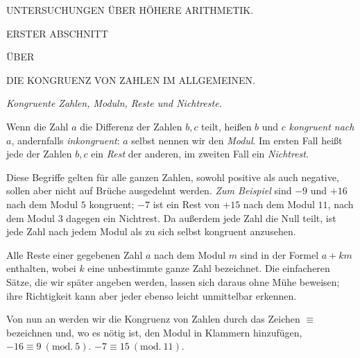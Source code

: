 \begin{center}
{\Large\textsc{UNTERSUCHUNGEN ÜBER HÖHERE ARITHMETIK.}}

\BookRule{\linewidth}

\textsc{ERSTER ABSCHNITT}

{\scriptsize\textsc{ÜBER}}

\textsc{DIE KONGRUENZ VON ZAHLEN IM ALLGEMEINEN.}

\end{center}

\begin{center}
\emph{Kongruente Zahlen, Moduln, Reste und Nichtreste.}
\end{center}


Wenn die Zahl $a$ die Differenz der Zahlen $b, c$ teilt, heißen $b$ und $c$ \emph{kongruent nach $a$}, andernfalls \emph{inkongruent}: $a$ selbst nennen wir den \emph{Modul}. Im ersten Fall heißt jede der Zahlen $b, c$ ein \emph{Rest} der anderen, im zweiten Fall ein \emph{Nichtrest}.

Diese Begriffe gelten für alle ganzen Zahlen, sowohl positive als auch negative, sollen aber nicht auf Brüche ausgedehnt werden. \emph{Zum Beispiel} sind $-9$ und $+16$ nach dem Modul $5$ kongruent; $-7$ ist ein Rest von $+15$ nach dem Modul $11$, nach dem Modul $3$ dagegen ein Nichtrest. Da außerdem jede Zahl die Null teilt, ist jede Zahl nach jedem Modul als zu sich selbst kongruent anzusehen.


Alle Reste einer gegebenen Zahl $a$ nach dem Modul $m$ sind in der Formel $a+km$ enthalten, wobei $k$ eine unbestimmte ganze Zahl bezeichnet. Die einfacheren Sätze, die wir später angeben werden, lassen sich daraus ohne Mühe beweisen; ihre Richtigkeit kann aber jeder ebenso leicht unmittelbar erkennen.

Von nun an werden wir die Kongruenz von Zahlen durch das Zeichen $\equiv$ bezeichnen und, wo es nötig ist, den Modul in Klammern hinzufügen, $-16\equiv 9\ (\mathrm{mod.}\ 5)$. $-7\equiv 15\ (\mathrm{mod.}\ 11)$.


